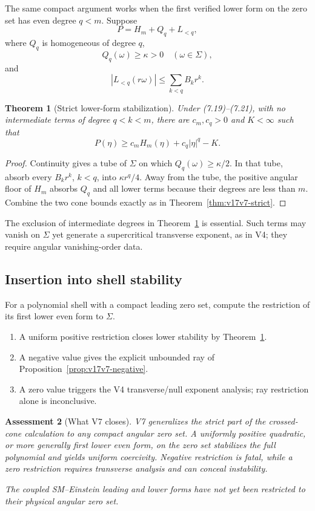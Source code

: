 \documentclass[11pt]{article}
\newtheorem{theorem}{Theorem}[section]
\newtheorem{assessment}[theorem]{Assessment}
\theoremstyle{remark}
\begin{document}
The same compact argument works when the first verified lower form
on the zero set has even degree \(q<m\).  Suppose
\[
 P=H_m+Q_q+L_{<q},                                  \tag{7.19}
\]
where \(Q_q\) is homogeneous of degree \(q\),
\[
 Q_q(\omega)\geq\kappa>0\quad(\omega\in\Sigma),     \tag{7.20}
\]
and
\[
 |L_{<q}(r\omega)|
 \leq\sum_{k<q}B_kr^k.                             \tag{7.21}
\]

\begin{theorem}[Strict lower-form stabilization]
\label{thm:v17v7-q}
Under (7.19)--(7.21), with no intermediate terms of degree
\(q<k<m\), there are \(c_m,c_q>0\) and \(K<\infty\) such that
\[
 P(\eta)\geq c_mH_m(\eta)+c_q|\eta|^q-K.           \tag{7.22}
\]
\end{theorem}

\begin{proof}
Continuity gives a tube of \(\Sigma\) on which
\(Q_q(\omega)\geq\kappa/2\).  In that tube, absorb every
\(B_kr^k\), \(k<q\), into \(\kappa r^q/4\).  Away from the tube,
the positive angular floor of \(H_m\) absorbs \(Q_q\) and all lower
terms because their degrees are less than \(m\).  Combine the two
cone bounds exactly as in
Theorem~\ref{thm:v17v7-strict}.
\end{proof}

The exclusion of intermediate degrees in
Theorem~\ref{thm:v17v7-q} is essential.  Such terms may vanish on
\(\Sigma\) yet generate a supercritical transverse exponent, as in
V4; they require angular vanishing-order data.

\subsection{Insertion into shell stability}

For a polynomial shell with a compact leading zero set, compute the
restriction of its first lower even form to \(\Sigma\).
\begin{enumerate}
\item A uniform positive restriction closes lower stability by
      Theorem~\ref{thm:v17v7-q}.
\item A negative value gives the explicit unbounded ray of
      Proposition~\ref{prop:v17v7-negative}.
\item A zero value triggers the V4 transverse/null exponent analysis;
      ray restriction alone is inconclusive.
\end{enumerate}

\begin{assessment}[What V7 closes]
\label{ass:v17v7-status}
V7 generalizes the strict part of the crossed-cone calculation to
any compact angular zero set.  A uniformly positive quadratic, or
more generally first lower even form, on the zero set stabilizes the
full polynomial and yields uniform coercivity.  Negative restriction
is fatal, while a zero restriction requires transverse analysis and
can conceal instability.

The coupled SM--Einstein leading and lower forms have not yet been
restricted to their physical angular zero set.
\end{assessment}
\end{document}
